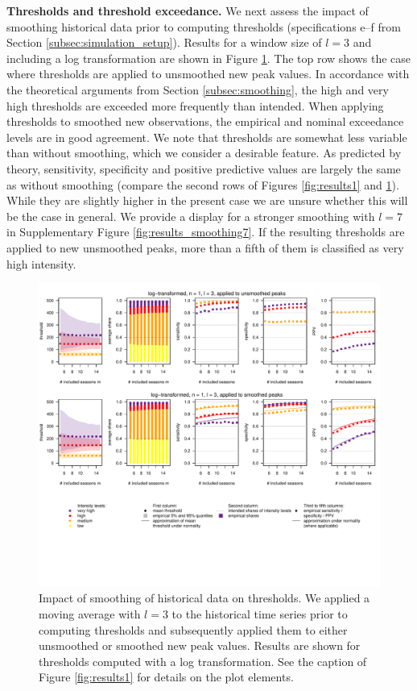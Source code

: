 \documentclass{article}
\begin{document}
\textbf{Thresholds and threshold exceedance.} We next assess the impact of smoothing historical data prior to computing thresholds (specifications e--f from Section \ref{subsec:simulation_setup}). Results for a window size of $l = 3$ and including a log transformation are shown in Figure \ref{fig:results_smoothing}. The top row shows the case where thresholds are applied to unsmoothed new peak values. In accordance with the theoretical arguments from Section \ref{subsec:smoothing}, the high and very high thresholds are exceeded more frequently than intended. When applying thresholds to smoothed new observations, the empirical and nominal exceedance levels are in good agreement. We note that thresholds are somewhat less variable than without smoothing, which we consider a desirable feature. As predicted by theory, sensitivity, specificity and positive predictive values are largely the same as without smoothing (compare the second rows of Figures \ref{fig:results1} and \ref{fig:results_smoothing}). While they are slightly higher in the present case we are unsure whether this will be the case in general. We provide a display for a stronger smoothing with $l = 7$ in Supplementary Figure \ref{fig:results_smoothing7}. If the resulting thresholds are applied to new unsmoothed peaks, more than a fifth of them is classified as very high intensity.

\begin{figure}[h!]
\centering
\includegraphics[width=1\textwidth]{figure/plot_smoothing3_fr_small.pdf}
\vspace{-33mm}

\caption{Impact of smoothing of historical data on thresholds. We applied a moving average with $l = 3$ to the historical time series prior to computing thresholds and subsequently applied them to either unsmoothed or smoothed new peak values. Results are shown for thresholds computed with a log transformation. See the caption of Figure \ref{fig:results1} for details on the plot elements.}
\label{fig:results_smoothing}
\end{figure}
\end{document}
